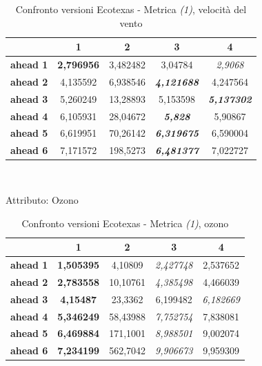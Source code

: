 \documentclass[12pt,a4paper,oneside,openright]{book}
\begin{document}
\begin{table}[H]
\centering
\begin{tabular}{|c|c|c|c|c|}
\hline
& 1 & 2 & 3 & 4 \\
\hline
\textbf{ahead 1} & \textbf{2,796956} & 3,482482 & 3,04784 & \textit{2,9068}\\
\hline
\textbf{ahead 2} & 4,135592 & 6,938546 & \textit{\textbf{4,121688}} & 4,247564\\ 
\hline
\textbf{ahead 3} & 5,260249 & 13,28893 & 5,153598 & \textit{\textbf{5,137302}}\\
\hline
\textbf{ahead 4} & 6,105931 & 28,04672 & \textit{\textbf{5,828}} & 5,90867 \\ 
\hline
\textbf{ahead 5} & 6,619951 & 70,26142 & \textit{\textbf{6,319675}} & 6,590004 \\
\hline
\textbf{ahead 6} & 7,171572 & 198,5273 & \textit{\textbf{6,481377}} & 7,022727 \\
\hline
\end{tabular} \\
\caption{Confronto versioni Ecotexas - Metrica \textit{(1)}, velocità del vento}
\end{table} 

\medskip

Attributo: Ozono \\ 

\begin{table}[H]
\centering
\begin{tabular}{|c|c|c|c|c|}
\hline
& 1 & 2 & 3 & 4 \\
\hline
\textbf{ahead 1} & \textbf{1,505395} & 4,10809 & \textit{2,427748} & 2,537652\\
\hline
\textbf{ahead 2} & \textbf{2,783558} & 10,10761 & \textit{4,385498} & 4,466039 \\
\hline
\textbf{ahead 3} & \textbf{4,15487} & 23,3362 & 6,199482 & \textit{6,182669} \\
\hline
\textbf{ahead 4} & \textbf{5,346249} & 58,43988 & \textit{7,752754} & 7,838081 \\
\hline
\textbf{ahead 5} & \textbf{6,469884} & 171,1001 & \textit{8,988501} & 9,002074 \\
\hline
\textbf{ahead 6} & \textbf{7,234199} & 562,7042 & \textit{9,906673} & 9,959309 \\ 
\hline
\end{tabular} \\
\caption{Confronto versioni Ecotexas - Metrica \textit{(1)}, ozono}
\end{table} 
\end{document}
